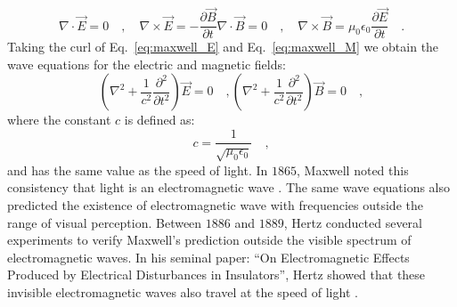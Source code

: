 \begin{subequations}
\begin{equation}
\label{eq:maxwell_E}
\nabla\cdot \vec{E}  = 0 \quad, \quad  \nabla\times\vec{E}   = -\frac{\partial\vec{B}}{\partial t}
\end{equation}
\begin{equation}
\label{eq:maxwell_M}
\nabla\cdot \vec{B}  = 0 \quad, \quad \nabla\times\vec{B}  =  \mu _0 \epsilon _0 \frac{\partial \vec{E}}{\partial t} \quad .
\end{equation}
\end{subequations}
Taking the curl of Eq.~\eqref{eq:maxwell_E} and Eq.~\eqref{eq:maxwell_M} we obtain the wave equations for the electric and magnetic fields:
\begin{subequations}
\begin{equation}
\label{eq:waveeq_E}
\left( \nabla ^2 + \frac{1}{c^2}\frac{\partial ^2}{\partial t^2}\right)\vec{E} = 0 \quad ,
\end{equation}
\begin{equation}
\label{eq:waveeq_B}
\left( \nabla ^2 + \frac{1}{c^2}\frac{\partial ^2}{\partial t^2}\right)\vec{B} = 0 \quad ,
\end{equation}
\end{subequations}
where the constant $c$ is defined as:
\begin{equation}
\label{eq:speed_of_light}
c = \frac{1}{\sqrt{\mu _0 \epsilon _0}} \quad ,
\end{equation}
and has the same value as the speed of light. In $\mathrm{1865}$, Maxwell noted this consistency that light is an electromagnetic wave \cite{ClerkMaxwell_1865}. The same wave equations also predicted the existence of electromagnetic wave with frequencies outside the range of visual perception. Between $1886$ and $1889$, Hertz conducted several experiments to verify Maxwell's prediction outside the visible spectrum of electromagnetic waves. In his seminal paper: ``On Electromagnetic Effects Produced by Electrical Disturbances in Insulators'', Hertz showed that these invisible electromagnetic waves also travel at the speed of light \cite{dagostino1975}.

